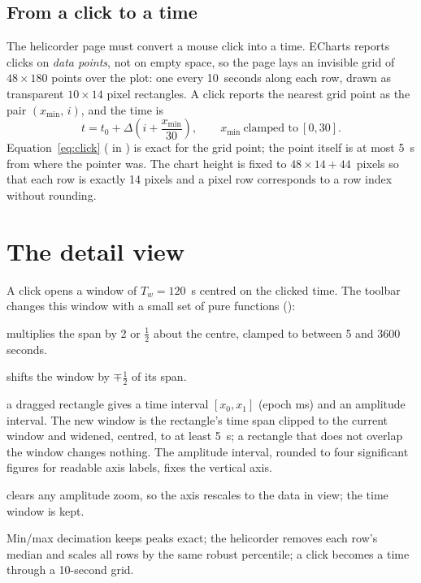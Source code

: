 \subsection{From a click to a time}
The helicorder page must convert a mouse click into a time. ECharts reports clicks on \emph{data points}, not on empty
space, so the page lays an invisible grid of $48\times180$ points over the plot: one every 10~seconds along each row, drawn as
transparent $10\times14$ pixel rectangles. A click reports the nearest grid point as the pair
$(x_{\min},\,i)$, and the time is
\begin{equation}\label{eq:click}
  t = t_0 + \Delta\left(i + \frac{x_{\min}}{30}\right),\qquad x_{\min}\ \text{clamped to}\ [0,30].
\end{equation}
Equation~\eqref{eq:click} ( in ) is exact for the grid point; the point
itself is at most 5~s from where the pointer was. The chart height is fixed to $48\times14+44$~pixels so that each row is
exactly 14 pixels and a pixel row corresponds to a row index without rounding.

\section{The detail view}
A click opens a window of $T_w=120$~s centred on the clicked time. The toolbar changes this window with a small set of
pure functions ():
\begin{description}[leftmargin=2.4cm,style=nextline]
\item[Zoom out / in] multiplies the span by 2 or $\tfrac12$ about the centre, clamped to between 5 and 3600 seconds.
\item[Earlier / later] shifts the window by $\mp\tfrac12$ of its span.
\item[Box zoom] a dragged rectangle gives a time interval $[x_0,x_1]$ (epoch ms) and an amplitude interval. The new window is
  the rectangle's time span clipped to the current window and widened, centred, to at least 5~s; a rectangle that does not
  overlap the window changes nothing. The amplitude interval, rounded to four significant figures for readable axis
  labels, fixes the vertical axis.
\item[Fit] clears any amplitude zoom, so the axis rescales to the data in view; the time window is kept.
\end{description}

\begin{rs3dkey}
Min/max decimation keeps peaks exact; the helicorder removes each row's median and scales all rows by the same robust
percentile; a click becomes a time through a 10-second grid.
\end{rs3dkey}
